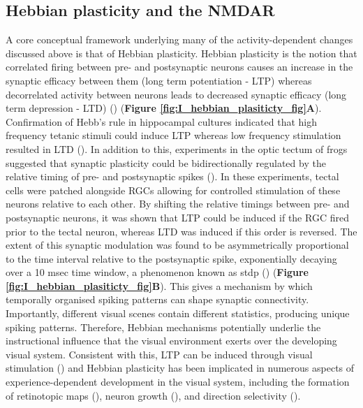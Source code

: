 \subsection{Hebbian plasticity and the NMDAR}
A core conceptual framework underlying many of the activity-dependent changes discussed above is that of Hebbian plasticity. Hebbian plasticity is the notion that correlated firing between pre- and postsynaptic neurons causes an increase in the synaptic efficacy between them  (long term potentiation - LTP) whereas decorrelated activity between neurons leads to decreased synaptic efficacy (long term depression - LTD) (\cite{Hebb1949, Stent1973ALearning.}) (\textbf{Figure \ref{fig:I_hebbian_plasiticty_fig}A}). Confirmation of Hebb’s rule in hippocampal cultures indicated that high frequency tetanic stimuli could induce LTP whereas low frequency stimulation resulted in LTD (\cite{Bliss1973LonglastingPath, Kemp2004HippocampalAccquisition,Dudek1992HomosynapticBlockade}). In addition to this, experiments in the optic tectum of frogs suggested that synaptic plasticity could be bidirectionally regulated by the relative timing of pre- and postsynaptic spikes (\cite{Zhang1998ASynapses}). In these experiments, tectal cells were patched alongside RGCs allowing for controlled stimulation of these neurons relative to each other. By shifting the relative timings between pre- and postsynaptic neurons, it was shown  that LTP could be induced if the RGC fired prior to the tectal neuron, whereas LTD was induced if this order is reversed. The extent of this synaptic modulation was found to be asymmetrically proportional to the time interval relative to the postsynaptic spike, exponentially decaying over a 10 msec time window,  a phenomenon known as \gls{stdp} (\cite{Mu2006SpikeSystem}) (\textbf{Figure \ref{fig:I_hebbian_plasiticty_fig}B}).  This gives a mechanism by which temporally organised spiking patterns can shape synaptic connectivity. Importantly, different visual scenes contain different statistics, producing unique spiking patterns. Therefore, Hebbian mechanisms potentially underlie the instructional influence that the visual environment exerts over the developing visual system. Consistent with this, LTP can be induced through visual stimulation (\cite{Zhang2000VisualSynapses}) and Hebbian plasticity has been implicated in numerous aspects of experience-dependent development in the visual system, including the formation of retinotopic maps (\cite{Ruthazer2003ControlVivo}), neuron growth (\cite{Munz2014RapidStimulation, Sin2002DendriteGTPases}), and direction selectivity (\cite{Engert2002MovingNeurons, Mu2006SpikeSystem}).

